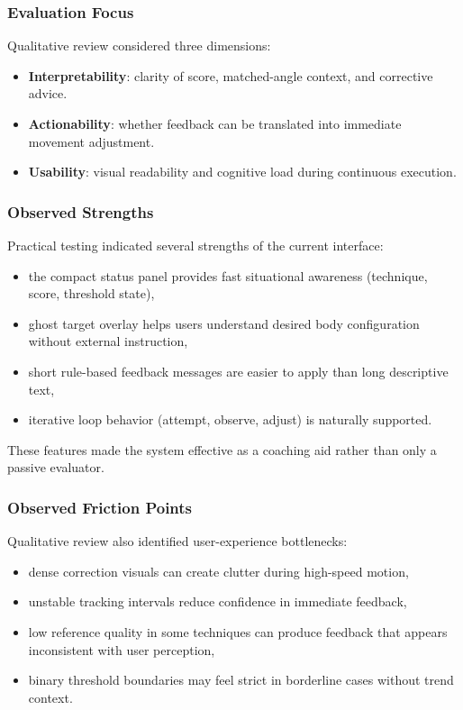 \documentclass[12pt]{article}
\begin{document}
{\subsubsection{Evaluation Focus}

Qualitative review considered three dimensions:

\begin{itemize}
    \item \textbf{Interpretability}: clarity of score, matched-angle context, and corrective advice.
    \item \textbf{Actionability}: whether feedback can be translated into immediate movement adjustment.
    \item \textbf{Usability}: visual readability and cognitive load during continuous execution.
\end{itemize}

\subsubsection{Observed Strengths}

Practical testing indicated several strengths of the current interface:

\begin{itemize}
    \item the compact status panel provides fast situational awareness (technique, score, threshold state),
    \item ghost target overlay helps users understand desired body configuration without external instruction,
    \item short rule-based feedback messages are easier to apply than long descriptive text,
    \item iterative loop behavior (attempt, observe, adjust) is naturally supported.
\end{itemize}

These features made the system effective as a coaching aid rather than only a passive evaluator.

\subsubsection{Observed Friction Points}

Qualitative review also identified user-experience bottlenecks:

\begin{itemize}
    \item dense correction visuals can create clutter during high-speed motion,
    \item unstable tracking intervals reduce confidence in immediate feedback,
    \item low reference quality in some techniques can produce feedback that appears inconsistent with user perception,
    \item binary threshold boundaries may feel strict in borderline cases without trend context.
\end{itemize}

}
\end{document}
